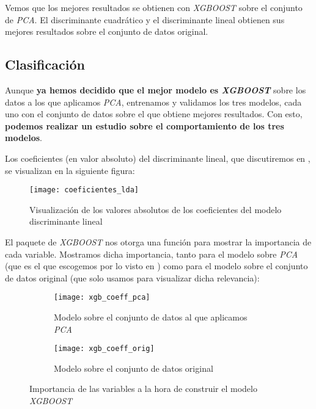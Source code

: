 Vemos que los mejores resultados se obtienen con \textit{XGBOOST} sobre el conjunto de \textit{PCA}. El discriminante cuadrático y el discriminante lineal obtienen sus mejores resultados sobre el conjunto de datos original.

\subsection{Clasificación}

Aunque \textbf{ya hemos decidido que el mejor modelo es \textit{XGBOOST}} sobre los datos a los que aplicamos \textit{PCA}, entrenamos y validamos los tres modelos, cada uno con el conjunto de datos sobre el que obtiene mejores resultados. Con esto, \textbf{podemos realizar un estudio sobre el comportamiento de los tres modelos}.

Los coeficientes (en valor absoluto) del discriminante lineal, que discutiremos en , se visualizan en la siguiente figura:

\begin{figure}[H]
    \centering
    \texttt{[image: coeficientes\_lda]}
    \caption{Visualización de los valores absolutos de los coeficientes del modelo discriminante lineal}
    \label{figure:coeficientes_lda}
\end{figure}

El paquete de \textit{XGBOOST} nos otorga una función para mostrar la importancia de cada variable. Mostramos dicha importancia, tanto para el modelo sobre \textit{PCA} (que es el que escogemos por lo visto en ) como para el modelo sobre el conjunto de datos original (que solo usamos para visualizar dicha relevancia):

\begin{figure}[H]
    \centering
    \begin{subfigure}{0.45\textwidth}
        \texttt{[image: xgb\_coeff\_pca]}
        \caption{Modelo sobre el conjunto de datos al que aplicamos \textit{PCA}}
    \end{subfigure}
    \begin{subfigure}{0.45\textwidth}
        \texttt{[image: xgb\_coeff\_orig]}
        \caption{Modelo sobre el conjunto de datos original}
    \end{subfigure}

    \caption{Importancia de las variables a la hora de construir el modelo \textit{XGBOOST}}
    \label{figure:importancias_xgb}
\end{figure}

